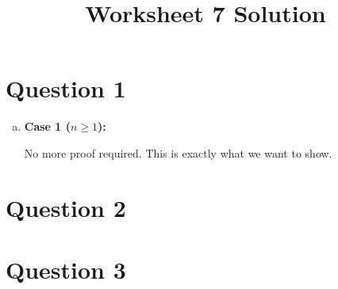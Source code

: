 \documentclass[12pt]{article}
\begin{document}
\title{Worksheet 7 Solution}
\maketitle

\section*{Question 1}
\begin{enumerate}[a.]
    \item

    \textbf{Case 1 ($n \geq 1$):}

    \bigskip

    No more proof required. This is exactly what we want to show.

\end{enumerate}

\section*{Question 2}

\section*{Question 3}
\end{document}
